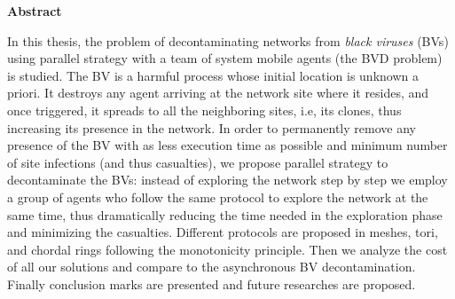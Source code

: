 
\begin{center}\textbf{Abstract}\end{center}



In this thesis, the problem of decontaminating networks from {\em black viruses} (BVs) using parallel strategy with a team of system mobile agents (the BVD problem) is studied.
The BV is a harmful process whose initial location is unknown a priori. It destroys any agent arriving at the network site where it resides, and once triggered, it spreads to all the neighboring sites, i.e, its clones, thus increasing its presence in the network. In order to permanently remove any presence of the BV with as less execution time as possible and minimum number of site infections (and thus casualties), we propose parallel strategy to decontaminate the BVs: instead of exploring the network step by step we employ a group of agents who follow the same protocol to explore the network at the same time, thus dramatically reducing the time needed in the exploration phase and minimizing the casualties. Different protocols are proposed in meshes, tori, and chordal rings following the monotonicity principle. Then we analyze the cost of all our solutions and compare to the asynchronous BV decontamination. 
Finally conclusion marks are presented and future researches are proposed.
 

 



\cleardoublepage
